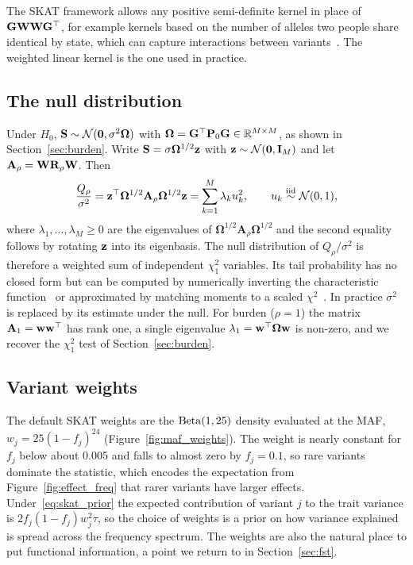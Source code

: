 The SKAT framework allows any positive semi-definite kernel in place of $\mathbf{G}\mathbf{W}\mathbf{W}\mathbf{G}^\top$, for example kernels based on the number of alleles two people share identical by state, which can capture interactions between variants~\citep{wu2011}. The weighted linear kernel is the one used in practice.

\subsection{The null distribution}

Under $H_0$, $\mathbf{S}\sim\mathcal{N}(\mathbf{0},\sigma^2\boldsymbol{\Omega})$ with $\boldsymbol{\Omega}=\mathbf{G}^\top\mathbf{P}_0\mathbf{G}\in\mathbb{R}^{M\times M}$, as shown in Section~\ref{sec:burden}. Write $\mathbf{S}=\sigma\boldsymbol{\Omega}^{1/2}\mathbf{z}$ with $\mathbf{z}\sim\mathcal{N}(\mathbf{0},\mathbf{I}_M)$ and let $\mathbf{A}_\rho=\mathbf{W}\mathbf{R}_\rho\mathbf{W}$. Then
\begin{equation}
  \frac{Q_\rho}{\sigma^2} = \mathbf{z}^\top\boldsymbol{\Omega}^{1/2}\mathbf{A}_\rho\boldsymbol{\Omega}^{1/2}\mathbf{z} = \sum_{k=1}^M \lambda_k u_k^2, \qquad u_k\overset{\text{iid}}{\sim}\mathcal{N}(0,1),
\end{equation}
where $\lambda_1,\dots,\lambda_M\geq 0$ are the eigenvalues of $\boldsymbol{\Omega}^{1/2}\mathbf{A}_\rho\boldsymbol{\Omega}^{1/2}$ and the second equality follows by rotating $\mathbf{z}$ into its eigenbasis. The null distribution of $Q_\rho/\sigma^2$ is therefore a weighted sum of independent $\chi^2_1$ variables. Its tail probability has no closed form but can be computed by numerically inverting the characteristic function~\citep{davies1980} or approximated by matching moments to a scaled $\chi^2$~\citep{liu2009chisq}. In practice $\sigma^2$ is replaced by its estimate under the null. For burden ($\rho=1$) the matrix $\mathbf{A}_1=\mathbf{w}\mathbf{w}^\top$ has rank one, a single eigenvalue $\lambda_1=\mathbf{w}^\top\boldsymbol{\Omega}\mathbf{w}$ is non-zero, and we recover the $\chi^2_1$ test of Section~\ref{sec:burden}.

\subsection{Variant weights}

The default SKAT weights are the $\operatorname{Beta}(1,25)$ density evaluated at the MAF, $w_j=25(1-f_j)^{24}$ (Figure~\ref{fig:maf_weights}). The weight is nearly constant for $f_j$ below about 0.005 and falls to almost zero by $f_j=0.1$, so rare variants dominate the statistic, which encodes the expectation from Figure~\ref{fig:effect_freq} that rarer variants have larger effects. Under~\eqref{eq:skat_prior} the expected contribution of variant $j$ to the trait variance is $2f_j(1-f_j)w_j^2\tau$, so the choice of weights is a prior on how variance explained is spread across the frequency spectrum. The weights are also the natural place to put functional information, a point we return to in Section~\ref{sec:fst}.

